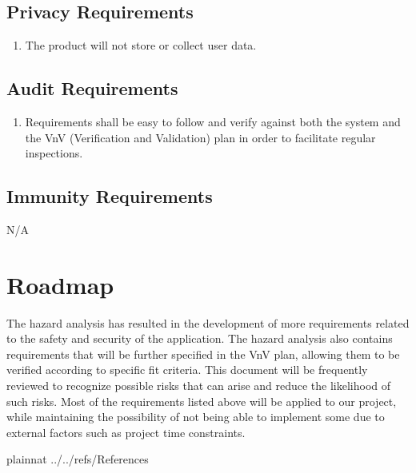 \documentclass{article}
\begin{document}
\subsection{Privacy Requirements}
\begin{enumerate}[{SR}1., leftmargin=2\parindent, resume]
    \item The product will not store or collect user data.
\end{enumerate}

\subsection{Audit Requirements}
\begin{enumerate}[{SR}1., leftmargin=2\parindent, resume]
    \item Requirements shall be easy to follow and verify against both the system and the VnV (Verification and Validation) plan in order to facilitate regular inspections.
\end{enumerate}

\subsection{Immunity Requirements}
N/A

\section{Roadmap}

The hazard analysis has resulted in the development of more requirements related to the safety and security of the application. The hazard 
analysis also contains requirements that will be further specified in the VnV plan, allowing them to be verified according to specific 
fit criteria. This document will be frequently reviewed to recognize possible risks that can arise and reduce the likelihood of such
risks. Most of the requirements listed above will be applied to our project, while maintaining the possibility of not being able to 
implement some due to external factors such as project time constraints.    

\newpage

 {plainnat}
 {../../refs/References}
\end{document}
